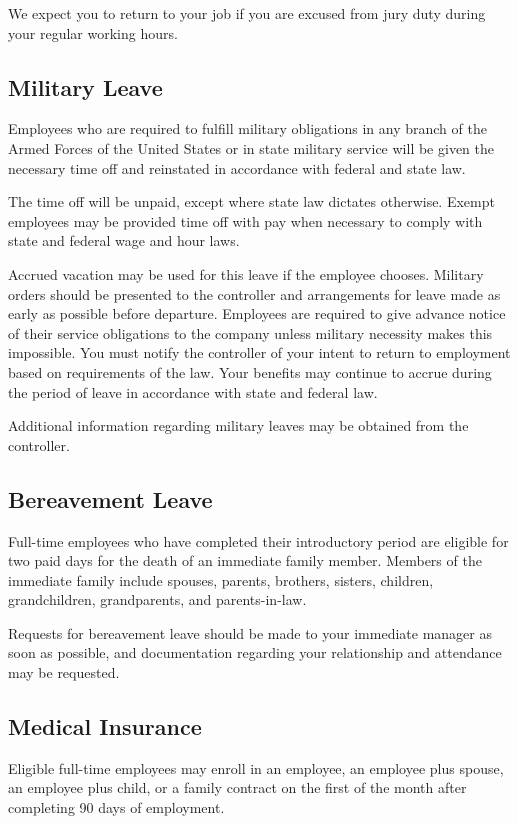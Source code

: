 We expect you to return to your job if you are excused from jury duty during your regular working hours.

\subsection{Military Leave}

Employees who are required to fulfill military obligations in any branch of the Armed Forces of the United States or in state military service will be given the necessary time off and reinstated in accordance with federal and state law.

The time off will be unpaid, except where state law dictates otherwise. Exempt employees may be provided time off with pay when necessary to comply with state and federal wage and hour laws.

Accrued vacation may be used for this leave if the employee chooses. Military orders should be presented to the controller and arrangements for leave made as early as possible before departure. Employees are required to give advance notice of their service obligations to the company unless military necessity makes this impossible. You must notify the controller of your intent to return to employment based on requirements of the law. Your benefits may continue to accrue during the period of leave in accordance with state and federal law.

Additional information regarding military leaves may be obtained from the controller.

\subsection{Bereavement Leave}

Full-time employees who have completed their introductory period are eligible for two paid days for the death of an immediate family member. Members of the immediate family include spouses, parents, brothers, sisters, children, grandchildren, grandparents, and parents-in-law.

Requests for bereavement leave should be made to your immediate manager as soon as possible, and documentation regarding your relationship and attendance may be requested.

\subsection{Medical Insurance}

Eligible full-time employees may enroll in an employee, an employee plus spouse, an employee plus child, or a family contract on the first of the month after completing 90 days of employment.

